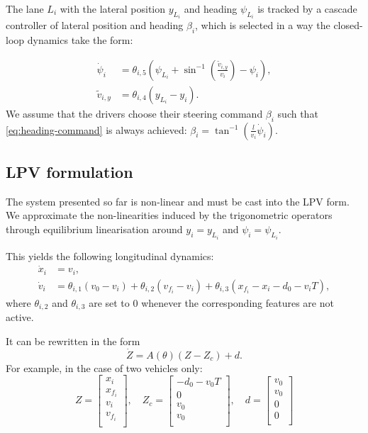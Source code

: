 \documentclass{article}
\begin{document}
The lane $L_i$ with the lateral position $y_{L_i}$ and heading $\psi_{L_i}$ is tracked by a cascade controller of lateral position and heading $\beta_i$, which is selected in a way the closed-loop dynamics take the form:

\begin{align}
	\label{eq:heading-command}
    \dot{\psi}_i &= \theta_{i,5}\left(\psi_{L_i}+\sin^{-1}\left(\frac{\tilde{v}_{i,y}}{v_i}\right)-\psi_i\right),\\
    \tilde{v}_{i,y} &= \theta_{i,4} (y_{L_i}-y_i). \nonumber
\end{align}
We assume that the drivers choose their steering command $\beta_i$ such that \eqref{eq:heading-command} is always achieved: $\beta_i = \tan^{-1}(\frac{l}{v_i}\dot{\psi}_i)$.

\subsection{LPV formulation}

The system presented so far is non-linear and must be cast into the LPV form. We approximate the non-linearities induced by the trigonometric operators through equilibrium linearisation around $y_i=y_{L_i}$ and $\psi_i=\psi_{L_i}$.

This yields the following longitudinal dynamics:
\begin{align*}
\dot{x}_i &= v_i,\\
\dot v_i &= \theta_{i,1} (v_0 - v_i) + \theta_{i,2} (v_{f_i} - v_i) + \theta_{i,3}(x_{f_i} - x_i - d_0 - v_i T),
\end{align*}
where $\theta_{i,2}$ and $\theta_{i,3}$ are set to $0$ whenever the corresponding features are not active.

It can be rewritten in the form $$\dot{Z} = A(\theta)(Z-Z_c) + d.$$ For example, in the case of two vehicles only:
\begin{equation*}
    Z = \begin{bmatrix}
x_i \\
x_{f_i} \\
v_i \\
v_{f_i} \\
\end{bmatrix}
,\quad
Z_c = \begin{bmatrix}
-d_0-v_0 T \\
0 \\
v_0\\
v_0 \\
\end{bmatrix}
,\quad
d = \begin{bmatrix}
v_0 \\
v_0 \\
0\\
0\\
\end{bmatrix}
\end{equation*}
\end{document}
